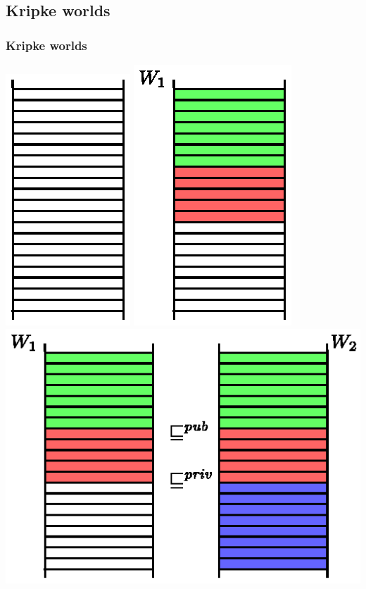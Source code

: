 \documentclass{beamer}
\begin{document}
\subsection{Kripke worlds}
\begin{frame}
  \frametitle{Kripke worlds}
  \begin{overprint}
    \includegraphics{Worlds/w1.eps}
    \includegraphics{Worlds/w2.eps}
    \includegraphics{Worlds/w3.eps}

\end{overprint}
\end{frame}
\end{document}
